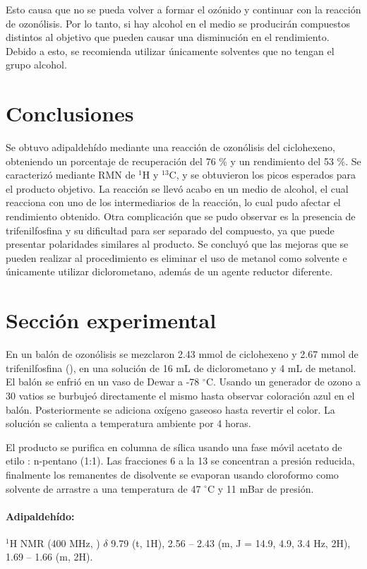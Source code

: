 \documentclass[fleqn,11pt]{SelfArx}
\begin{document}
Esto causa que no se pueda volver a formar el ozónido y continuar con la reacción de ozonólisis\cite{Carey2007}. Por lo tanto, si hay alcohol en el medio se producirán compuestos distintos al objetivo que pueden causar una disminución en el rendimiento. Debido a esto, se recomienda utilizar únicamente solventes que no tengan el grupo alcohol.
\pagebreak

\section{Conclusiones}
Se obtuvo adipaldehído mediante una reacción de ozonólisis del ciclohexeno, obteniendo un porcentaje de recuperación del 76 \% y un rendimiento del 53 \%. Se caracterizó mediante RMN de $^1$H y $^{13}$C, y se obtuvieron los picos esperados para el producto objetivo. La reacción se llevó acabo en un medio de alcohol, el cual reacciona con uno de los intermediarios de la reacción, lo cual pudo afectar el rendimiento obtenido. Otra complicación que se pudo observar es la presencia de trifenilfosfina y su dificultad para ser separado del compuesto, ya que puede presentar polaridades similares al producto. Se concluyó que las mejoras que se pueden realizar al procedimiento es eliminar el uso de metanol como solvente e únicamente utilizar diclorometano, adem\'as de un agente reductor diferente.

\section{Secci\'on experimental}
En un bal\'on de ozon\'olisis se mezclaron 2.43 mmol de ciclohexeno y 2.67 mmol de trifenilfosfina (), en una soluci\'on de 16 mL de diclorometano y 4 mL de metanol. El bal\'on se enfri\'o en un vaso de Dewar a -78 $^\circ$C. Usando un generador de ozono a 30 vatios se burbuje\'o directamente el mismo hasta observar coloraci\'on azul en el bal\'on. Posteriormente se adiciona ox\'igeno gaseoso hasta revertir el color. La soluci\'on se calienta a temperatura ambiente por 4 horas. 

El producto se purifica en columna de s\'ilica usando una fase m\'ovil acetato de etilo : n-pentano (1:1). Las fracciones 6 a la 13 se concentran a presi\'on reducida, finalmente los remanentes de disolvente se evaporan usando cloroformo como solvente de arrastre a una temperatura de 47 $^\circ$C y 11 mBar de presi\'on.

\paragraph{Adipaldeh\'ido:}
$^1$H NMR (400 MHz, ) $\delta$ 9.79 (t, 1H), 2.56 – 2.43 (m, J = 14.9, 4.9, 3.4 Hz, 2H), 1.69 – 1.66 (m, 2H).
\end{document}
